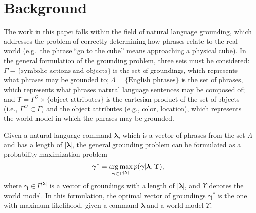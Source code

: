\section{Background}
\label{sec:background}
The work in this paper falls within the field of natural language grounding, which addresses the problem of correctly determining how phrases relate to the real world (e.g., the phrase ``go to the cube'' means approaching a physical cube).
In the general formulation of the grounding problem, three sets must be considered: ${\Gamma = \{\text{symbolic actions and objects\}}}$ is the set of groundings, which represents what phrases may be grounded to; ${\Lambda = \{\text{English phrases}\}}$ is the set of phrases, which represents what phrases natural language sentences may be composed of; and ${\Upsilon = \Gamma^O \times \{\text{object attributes}\} }$ is the cartesian product of the set of objects (i.e., $\Gamma^O \subset \Gamma$) and the object attributes (e.g., color, location), which represents the world model in which the phrases may be grounded. 

Given a natural language command $\boldsymbol{\lambda}$, which is a vector of phrases from the set $\Lambda$ and has a length of $|\boldsymbol{\lambda}|$, 
the general grounding problem can be formulated as a probability maximization problem%
\begin{equation}
\boldsymbol{\gamma}^* = \operatorname*{\arg\max}_{\boldsymbol{\gamma} \in \Gamma^{|\boldsymbol{\lambda}|}} p(\boldsymbol{\gamma}|\boldsymbol{\lambda},\Upsilon),
\label{eq:max_ground_prob}
\end{equation}
where $\boldsymbol{\gamma} \in \Gamma^{|\boldsymbol{\lambda}|}$ is a vector of groundings with a length of $|\boldsymbol{\lambda}|$, and $\Upsilon$ denotes the world model. 
In this formulation, the optimal vector of groundings $\boldsymbol{\gamma}^*$ is the one with maximum likelihood, given a command $\boldsymbol{\lambda}$ and a world model $\Upsilon$.

